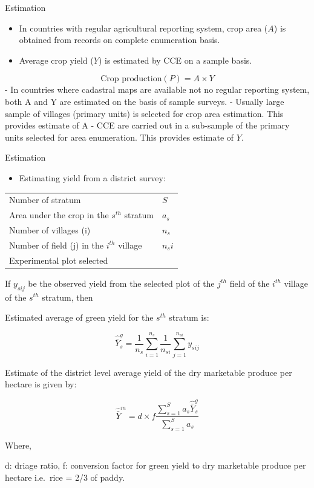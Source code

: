 \documentclass[11pt,dvipsnames,ignorenonframetext,aspectratio=169]{beamer}
\providecommand{\tightlist}{%
  \setlength{\itemsep}{0pt}\setlength{\parskip}{0pt}}
\begin{document}
\begin{frame}{Estimation}
\protect\hypertarget{estimation}{}
\begin{itemize}
\tightlist
\item
  In countries with regular agricultural reporting system, crop area
  (\(A\)) is obtained from records on complete enumeration basis.
\item
  Average crop yield (\(Y\)) is estimated by CCE on a sample basis.
\end{itemize}

\[
\text{Crop production} (P) = A \times Y
\] - In countries where cadastral maps are available not no regular
reporting system, both A and Y are estimated on the basis of sample
surveys. - Usually large sample of villages (primary units) is selected
for crop area estimation. This provides estimate of A - CCE are carried
out in a sub-sample of the primary units selected for area enumeration.
This provides estimate of \(Y\).
\end{frame}

\begin{frame}{Estimation}
\protect\hypertarget{estimation-1}{}
\begin{itemize}
\tightlist
\item
  Estimating yield from a district survey:
\end{itemize}

\begin{table}
\centering\begingroup\fontsize{8}{10}\selectfont

\begin{tabular}{ll}
\toprule
 & \\
\midrule
Number of stratum & $S$\\
Area under the crop in the $s^{th}$ stratum & $a_s$\\
Number of villages (i) & $n_s$\\
Number of field (j) in the $i^{th}$ village & $n_si$\\
Experimental plot selected & \\
\bottomrule
\end{tabular}
\endgroup{}
\end{table}
\end{frame}

\begin{frame}{}
\protect\hypertarget{section-2}{}
If \(y_{sij}\) be the observed yield from the selected plot of the
\(j^{th}\) field of the \(i^{th}\) village of the \(s^{th}\) stratum,
then

Estimated average of green yield for the \(s^{th}\) stratum is:

\[
\hat{\bar{Y}}_s^g = \frac{1}{n_s} \sum^{n_{s}}_{i = 1} \frac{1}{n_{si}} \sum^{n_{si}}_{j = 1} y_{sij}
\]

Estimate of the district level average yield of the dry marketable
produce per hectare is given by:

\[
\hat{\bar{Y}}^m = d \times f \frac{\sum^S_{s = 1} a_s \hat{\bar{Y}}_s^g}{\sum^S_{s = 1}a_s}
\]

Where,

d: driage ratio, f: conversion factor for green yield to dry marketable
produce per hectare i.e.~rice = 2/3 of paddy.
\end{frame}
\end{document}
